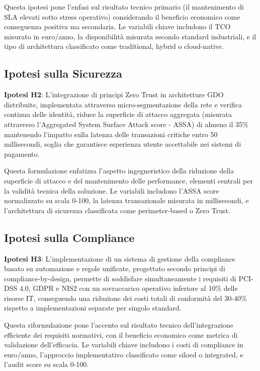 \documentclass{report}
\begin{document}
Questa ipotesi pone l'enfasi sul risultato tecnico primario (il
mantenimento di SLA elevati sotto stress operativo) considerando il beneficio economico come conseguenza positiva ma secondaria. Le
variabili chiave includono il TCO misurato in euro/anno, la disponibilità misurata secondo standard industriali, e il tipo di architettura classificato come traditional, hybrid o cloud-native.

\subsection{\texorpdfstring{\textbf{Ipotesi sulla
Sicurezza}}{1.4.2 Ipotesi sulla Sicurezza}}\label{ipotesi-sulla-sicurezza}

\textbf{Ipotesi H2}: L'integrazione di principi Zero Trust in architetture GDO distribuite, implementata attraverso micro-segmentazione della rete e verifica continua delle identità, riduce la superficie di attacco aggregata (misurata attraverso l'Aggregated System Surface Attack score - ASSA) di almeno il 35\% mantenendo l'impatto sulla latenza delle transazioni critiche entro 50 millisecondi, soglia che garantisce esperienza utente accettabile nei sistemi di pagamento.

Questa formulazione enfatizza l'aspetto ingegneristico della riduzione della superficie di attacco e del mantenimento delle performance, elementi centrali per la validità tecnica della soluzione. Le variabili includono l'ASSA score normalizzato su scala 0-100, la latenza transazionale misurata in millisecondi, e l'architettura di sicurezza classificata come perimeter-based o Zero Trust.

\subsection{\texorpdfstring{\textbf{Ipotesi sulla
Compliance}}{1.4.3 Ipotesi sulla Compliance}}\label{ipotesi-sulla-compliance}

\textbf{Ipotesi H3}: L'implementazione di un sistema di gestione della compliance basato su automazione e regole unificate, progettato secondo principi di compliance-by-design, permette di soddisfare simultaneamente i requisiti di PCI-DSS 4.0, GDPR e NIS2 con un sovraccarico operativo inferiore al 10\% delle risorse IT, conseguendo una riduzione dei costi
totali di conformità del 30-40\% rispetto a implementazioni separate per singolo standard.

Questa riformulazione pone l'accento sul risultato tecnico
dell'integrazione efficiente dei requisiti normativi, con il beneficio economico come metrica di validazione dell'efficacia. Le variabili chiave includono i costi di compliance in euro/anno, l'approccio implementativo classificato come siloed o integrated, e l'audit score su scala 0-100.
\end{document}
